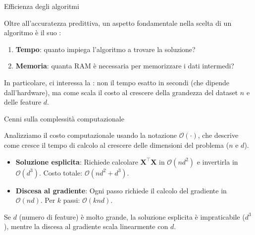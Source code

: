 \documentclass[12pt,aspectratio=169]{beamer}
\begin{document}
\begin{frame}{Efficienza degli algoritmi}
	
	Oltre all'accuratezza predittiva, un aspetto fondamentale nella scelta di un algoritmo è il suo :
	\begin{enumerate}
		\item \textbf{Tempo}: quanto impiega l'algoritmo a trovare la soluzione?
		\item \textbf{Memoria}: quanta RAM è necessaria per memorizzare i dati intermedi?
	\end{enumerate}
	In particolare, ci interessa la : non il tempo esatto in secondi (che dipende dall'hardware), ma come scala il costo al crescere della grandezza del dataset $n$ e delle feature $d$.
	
\end{frame}

\begin{frame}{Cenni sulla complessità computazionale}
	
	Analizziamo il costo computazionale usando la notazione $\mathcal{O}(\cdot)$, che descrive come cresce il tempo di calcolo al crescere delle dimensioni del problema ($n$ e $d$).
	
	\begin{itemize}
		\item \textbf{Soluzione esplicita}: Richiede calcolare $\mathbf{X}^\top\mathbf{X}$ in $\mathcal{O}(nd^2)$ e invertirla in $\mathcal{O}(d^3)$. Costo totale: $\mathcal{O}(nd^2 + d^3)$.
		\item \textbf{Discesa al gradiente}: Ogni passo richiede il calcolo del gradiente in $\mathcal{O}(nd)$. Per $k$ passi: $\mathcal{O}(knd)$.
	\end{itemize}
	Se $d$ (numero di feature) è molto grande, la soluzione esplicita è impraticabile ($d^3$), mentre la discesa al gradiente scala linearmente con $d$.
	
\end{frame}
\end{document}
